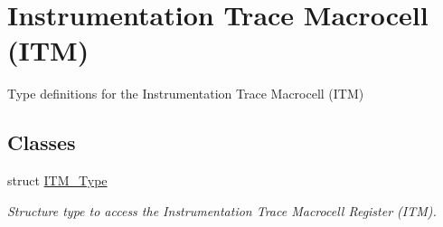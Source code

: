 \hypertarget{group___c_m_s_i_s___i_t_m}{\section{Instrumentation Trace Macrocell (I\-T\-M)}
\label{group___c_m_s_i_s___i_t_m}
}


Type definitions for the Instrumentation Trace Macrocell (I\-T\-M)  


\subsection*{Classes}
\begin{DoxyCompactItemize}
\item 
struct \hyperlink{struct_i_t_m___type}{I\-T\-M\-\_\-\-Type}
\begin{DoxyCompactList}\small\item\em Structure type to access the Instrumentation Trace Macrocell Register (I\-T\-M). \end{DoxyCompactList}\end{DoxyCompactItemize}
